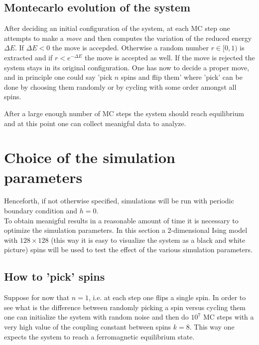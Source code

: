 \documentclass[a4paper, 11pt]{article}
\begin{document}

  \subsection{Montecarlo evolution of the system}
    After deciding an initial configuration of the system, at each MC step one attempts to make a \emph{move} and then computes the variation of the reduced energy $\Delta E$. If $\Delta E < 0$ the move is accepded. Otherwise a random number $r \in [0,1)$ is extracted and if $r < e^{-\Delta E}$ the move is accepted as well. If the move is rejected the system stays in its original configuration.
    One has now to decide a proper move, and in principle one could say 'pick $n$ spins and flip them' where 'pick' can be done by choosing them randomly or by cycling with some order amongst all spins.

    After a large enough number of MC steps the system should reach equilibrium and at this point one can collect meanigful data to analyze.


  \section{Choice of the simulation parameters}
    Henceforth, if not otherwise specified, simulations will be run with periodic boundary condition and $h = 0$. \\
    To obtain meanigful results in a reasonable amount of time it is necessary to optimize the simulation parameters. In this section a 2-dimensional Ising model with $128 \times 128$ (this way it is easy to visualize the system as a black and white picture) spins will be used to test the effect of the various simulation parameters.


    \subsection{How to 'pick' spins}
      Suppose for now that $n = 1$, i.e. at each step one flips a single spin. In order to see what is the difference between randomly picking a spin versus cycling them one can initialize the system with random noise and then do $10^7$ MC steps with a very high value of the coupling constant between spins $k = 8$. This way one expects the system to reach a ferromagnetic equilibrium state.
\end{document}
